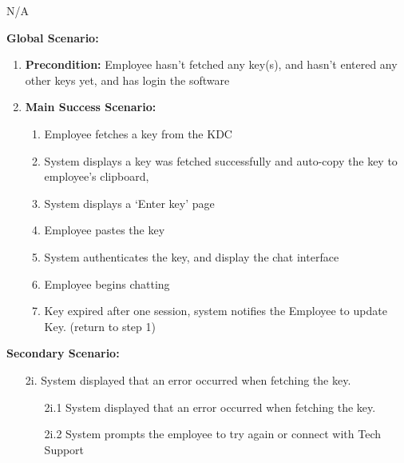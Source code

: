 \documentclass[]{article}
\begin{document}
\begin{enumerate}[{\bf BE1.}]
\begin{enumerate}[{\bf BE9.}]
\begin{enumerate}[{\bf VP1.}]
            N/A \\
		\end{enumerate}
		{\bf Global Scenario:}\\
        \begin{enumerate}[{  }]
            \item \textbf{Precondition:} Employee hasn’t fetched any key(s), and hasn’t entered any other keys yet, and has login the software 
            \item \textbf{Main Success Scenario:}
            \begin{enumerate}[{  1.}]
                    \item Employee fetches a key from the KDC 
		    \item System displays a key was fetched successfully and auto-copy the key to employee’s clipboard,  
		    \item System displays a ‘Enter key’ page  
		    \item Employee pastes the key 
                    \item System authenticates the key, and display the chat interface 
		    \item Employee begins chatting 
                    \item Key expired after one session, system notifies the Employee to update Key. (return to step 1)   
            \end{enumerate}
        \end{enumerate}
	        \textbf{Secondary Scenario:}
                \begin{enumerate}
		
                    \item[2i.] System displayed that an error occurred when fetching the key. 
                    \begin{enumerate}
                        \item[2i.1] System displayed that an error occurred when fetching the key. 
                        \item[2i.2] System prompts the employee to try again or connect with Tech Support
                    \end{enumerate}
		    

\end{enumerate}
\end{enumerate}
\end{enumerate}
\end{document}
